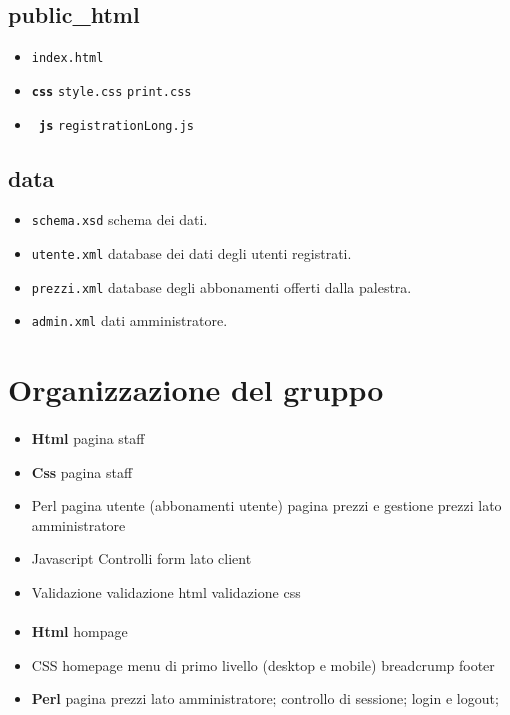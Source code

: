 \documentclass[12pt,a4paper]{article}
\begin{document}
\subsection{public\_html}
\begin{itemize}
	\item \texttt{index.html } 
	\item \texttt{\textbf{css}}
		\subitem \texttt{style.css}
		\subitem \texttt{print.css}
	\item\texttt{\textbf{ js}}
	\subitem \texttt{registrationLong.js}
\end{itemize}
\subsection{data}
\begin{itemize}
	\item \texttt{schema.xsd} schema dei dati. 
	\item \texttt{utente.xml} database dei dati degli utenti registrati. 
	\item \texttt{prezzi.xml} database degli abbonamenti offerti dalla palestra. 
	\item \texttt{admin.xml} dati amministratore. 
\end{itemize}

\section{Organizzazione del gruppo}
\paragraph{\TF{}}
\begin{itemize}
	\item \textbf{Html}
	\subitem pagina staff
	\item \textbf{Css}
	\subitem pagina staff
	\item{Perl}
	\subitem pagina utente (abbonamenti utente)
	\subitem pagina prezzi e gestione prezzi lato amministratore
	\item Javascript
	\subitem Controlli form lato client
	\item Validazione
	\subitem validazione html
	\subitem validazione css
	
\end{itemize}
\paragraph{\LB{}}
\begin{itemize}
	\item \textbf{Html}
	\subitem hompage
	\item{CSS}
	\subitem homepage
	\subitem menu di primo livello (desktop e mobile)
	\subitem breadcrump
	\subitem footer
	\item \textbf{Perl}
	\subitem pagina prezzi lato amministratore;
	\subitem controllo di sessione;
	\subitem login e logout;
\end{itemize}
\end{document}
